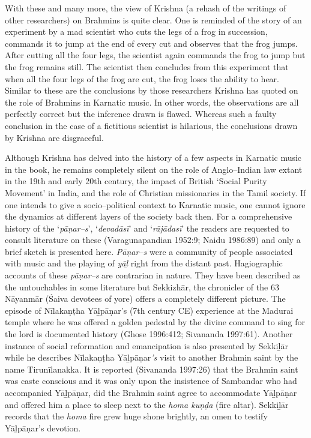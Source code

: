 With these and many more, the view of Krishna (a rehash of the writings of other researchers) on Brahmins is quite clear. One is reminded of the story of an experiment by a mad scientist who cuts the legs of a frog in succession, commands it to jump at the end of every cut and observes that the frog jumps. After cutting all the four legs, the scientist again commands the frog to jump but the frog remains still. The scientist then concludes from this experiment that when all the four legs of the frog are cut, the frog loses the ability to hear. Similar to these are the conclusions by those researchers Krishna has quoted on the role of Brahmins in Karnatic music. In other words, the observations are all perfectly correct but the inference drawn is flawed. Whereas such a faulty conclusion in the case of a fictitious scientist is hilarious, the conclusions drawn by Krishna are disgraceful.

Although Krishna has delved into the history of a few aspects in Karnatic music in the book, he remains completely silent on the role of Anglo–Indian law extant in the 19th and early 20th century, the impact of British ‘Social Purity Movement’ in India, and the role of Christian missionaries in the Tamil society. If one intends to give a socio–political context to Karnatic music, one cannot ignore the dynamics at different layers of the society back then. For a comprehensive history of the ‘\textit{pāṇar–s}’, ‘\textit{devadāsī}’ and ‘\textit{rājādasī}’ the readers are requested to consult literature on these (Varagunapandian 1952:9; Naidu 1986:89) and only a brief sketch is presented here. \textit{Pāṇar–s} were a community of people associated with music and the playing of \textit{yāḻ} right from the distant past. Hagiographic accounts of these \textit{pāṇar–s} are contrarian in nature. They have been described as the untouchables in some literature but Sekkizhār, the chronicler of the 63 Nāyanmār (Śaiva devotees of yore) offers a completely different picture. The episode of Nīlakaṇṭha Yāḻpāṇar’s (7th century CE) experience at the Madurai temple where he was offered a golden pedestal by the divine command to sing for the lord is documented history (Ghose 1996:412; Sivananda 1997:61). Another instance of social reformation and emancipation is also presented by Sekkiḻār while he describes Nīlakaṇṭha Yāḻpāṇar\textit{’s} visit to another Brahmin saint by the name Tirunīlanakka. It is reported (Sivananda 1997:26) that the Brahmin saint was caste conscious and it was only upon the insistence of Sambandar who had accompanied Yāḻpāṇar, did the Brahmin saint agree to accommodate Yāḻpāṇar and offered him a place to sleep next to the \textit{homa kuṇḍa} (fire altar). Sekkiḻār records that the \textit{homa} fire grew huge shone brightly, an omen to testify Yāḻpāṇar’s devotion.

